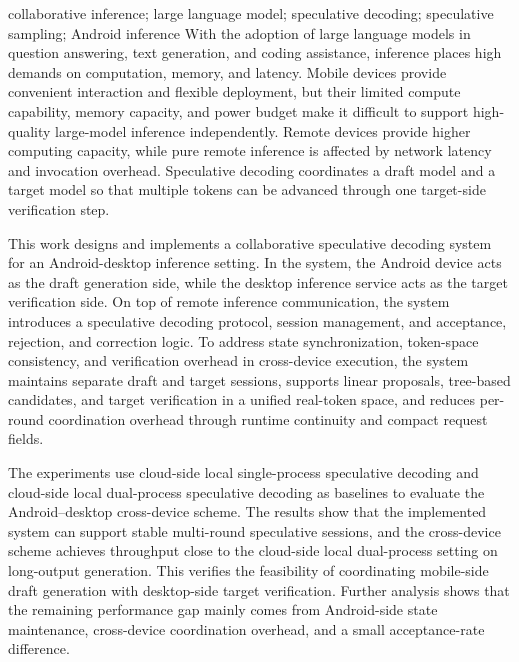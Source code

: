 \begin{英文摘要}{collaborative inference; large language model; speculative decoding; speculative sampling; Android inference}
With the adoption of large language models in question answering, text generation, and coding assistance, inference places high demands on computation, memory, and latency. Mobile devices provide convenient interaction and flexible deployment, but their limited compute capability, memory capacity, and power budget make it difficult to support high-quality large-model inference independently. Remote devices provide higher computing capacity, while pure remote inference is affected by network latency and invocation overhead. Speculative decoding coordinates a draft model and a target model so that multiple tokens can be advanced through one target-side verification step.

This work designs and implements a collaborative speculative decoding system for an Android-desktop inference setting. In the system, the Android device acts as the draft generation side, while the desktop inference service acts as the target verification side. On top of remote inference communication, the system introduces a speculative decoding protocol, session management, and acceptance, rejection, and correction logic. To address state synchronization, token-space consistency, and verification overhead in cross-device execution, the system maintains separate draft and target sessions, supports linear proposals, tree-based candidates, and target verification in a unified real-token space, and reduces per-round coordination overhead through runtime continuity and compact request fields.

The experiments use cloud-side local single-process speculative decoding and cloud-side local dual-process speculative decoding as baselines to evaluate the Android--desktop cross-device scheme. The results show that the implemented system can support stable multi-round speculative sessions, and the cross-device scheme achieves throughput close to the cloud-side local dual-process setting on long-output generation. This verifies the feasibility of coordinating mobile-side draft generation with desktop-side target verification. Further analysis shows that the remaining performance gap mainly comes from Android-side state maintenance, cross-device coordination overhead, and a small acceptance-rate difference.
\end{英文摘要}
